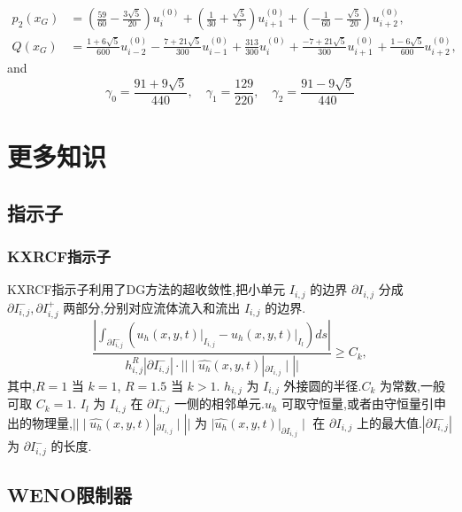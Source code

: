 \documentclass{book}
\begin{document}
\begin{example}
\begin{example}{}{}
\begin{example}
\begin{example}
\begin{example}
\begin{equation}
\begin{aligned}
        p_{2}\left(x_{G}\right) & =\left(\frac{59}{60}-\frac{3 \sqrt{5}}{20}\right) u_{i}^{(0)}+\left(\frac{1}{30}+\frac{\sqrt{5}}{5}\right) u_{i+1}^{(0)}+\left(-\frac{1}{60}-\frac{\sqrt{5}}{20}\right) u_{i+2}^{(0)},       \\
        Q\left(x_{G}\right)     & =\frac{1+6 \sqrt{5}}{600} u_{i-2}^{(0)}-\frac{7+21 \sqrt{5}}{300} u_{i-1}^{(0)}+\frac{313}{300} u_{i}^{(0)}+\frac{-7+21 \sqrt{5}}{300} u_{i+1}^{(0)}+\frac{1-6 \sqrt{5}}{600} u_{i+2}^{(0)},
    \end{aligned}
\end{equation}
and
\begin{equation}
    \gamma_{0}=\frac{91+9 \sqrt{5}}{440}, \quad \gamma_{1}=\frac{129}{220}, \quad \gamma_{2}=\frac{91-9 \sqrt{5}}{440}
\end{equation}



\chapter{更多知识}
\section{指示子}
\subsection{KXRCF指示子}
KXRCF指示子利用了DG方法的超收敛性\cite{RN92},把小单元 $I_{i,j}$ 的边界 $\partial I_{i,j}$ 分成 $\partial I_{i,j}^-,\partial I_{i,j}^+$ 两部分,分别对应流体流入和流出 $I_{i,j}$ 的边界.
\begin{equation}
    \frac{\left|\int_{\partial I_{i, j}^{-}}\left(\left.u_{h}(x, y, t)\right|_{I_{i, j}}-\left.u_{h}(x, y, t)\right|_{I_{l}}\right) d s\right|}{h_{i, j}^{R}\left|\partial I_{i, j}^{-}\right| \cdot||\mid \widehat{u_{h}}(x, y, t)|_{\partial I_{i, j}}\mid||} \geq C_{k},
\end{equation}
其中,$R=1$ 当 $k=1$, $R=1.5$ 当 $k>1$. $h_{i,j}$ 为 $I_{i,j}$ 外接圆的半径.$C_k$ 为常数,一般可取 $C_k = 1$. $I_l$ 为 $I_{i,j}$ 在 $\partial I_{i,j}^-$ 一侧的相邻单元.$u_h$ 可取守恒量,或者由守恒量引申出的物理量,$||\mid \widehat{u_{h}}(x, y, t)|_{\partial I_{i, j}}\mid||$ 为 $\mid \widehat{u_{h}}(x, y, t)|_{\partial I_{i, j}}\mid$ 在 $\partial I_{i,j}$ 上的最大值.$|\partial I_{i,j}^-|$ 为 $\partial I_{i,j}^-$ 的长度.
\section{WENO限制器}


\end{example}
\end{example}
\end{example}
\end{example}
\end{example}
\end{document}
